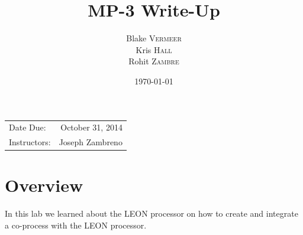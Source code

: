 \documentclass{article}
\title{MP-3 Write-Up} %
\author{Blake \textsc{Vermeer}\\
		Kris \textsc{Hall}\\
		Rohit \textsc{Zambre}} %
\date{\today} %
\begin{document}
\maketitle %

\begin{center}
\begin{tabular}{l r}
Date Due: & October 31, 2014 \\ %
Instructors: & Joseph Zambreno %
\end{tabular}
\end{center}








\section{Overview}
In this lab we learned about the LEON processor on how to create and integrate a co-process with the LEON processor.


\end{document}
